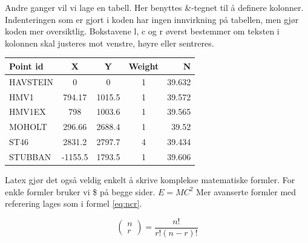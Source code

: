 \documentclass[a4paper]{report}
\begin{document}
    Andre ganger vil vi lage en tabell. Her benyttes \&-tegnet til å definere kolonner. Indenteringen som er gjort i koden har ingen innvirkning på tabellen, men gjør koden mer oversiktlig. Bokstavene l, c og r øverst bestemmer om teksten i kolonnen skal justeres mot venstre, høyre eller sentreres.
    
    \begin{center}
        \begin{tabular}{ | l | c | c | c | r | }
            \hline
            Point id &       X &       Y & Weight & 		 N\\
            \hline
            \hline
            HAVSTEIN &       0 &       0 &		1 &		39.632\\
            HMV1     &  794.17 &  1015.5 &		1 &		39.572\\
            HMV1EX   &     798 &  1003.6 &		1 &		39.565\\
            MOHOLT   &  296.66 &  2688.4 &		1 &		 39.52\\
            ST46     &  2831.2 &  2797.7 &		4 &		39.434\\
            STUBBAN  & -1155.5 &  1793.5 &		1 &		39.606\\
            \hline
        \end{tabular}
        \label{table:gps-points}
    \end{center}

    Latex gjør det også veldig enkelt å skrive komplekse matematiske formler. For enkle formler bruker vi \$ på begge sider. $E = MC^{2}$
    Mer avanserte formler med referering lages som i formel \ref{eq:ncr}.
    
    \begin{equation}
        \label{eq:ncr}
        \left(\!
        \begin{array}{c}
          n \\
          r
        \end{array}
        \!\right) = \frac{n!}{r!(n-r)!}
    \end{equation}
    
    
    
\end{document}
